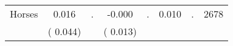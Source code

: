 \begin{tabular}{l*{7}{c}}
 Horses       &              0.016       &            .  &             -0.000       &            .  &              0.010       &                  . &  2678 \\ 
                       &       (       0.044)             &                               &       (       0.013)                     &                               &                                               &                                &                      \\ 

\hline \end{tabular}